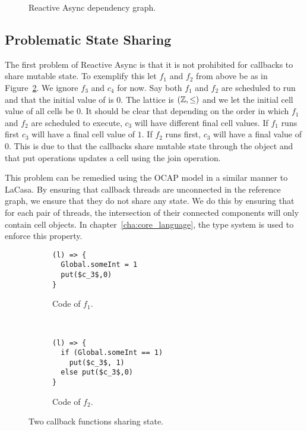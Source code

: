 \begin{figure}
  \centering
  \caption{Reactive Async dependency graph.}
  \label{fig:ra_example2}
\end{figure}

\subsection{Problematic State Sharing}%
\label{sub:sharing_state}

The first problem of Reactive Async is that it is not prohibited for callbacks
to share mutable state. To exemplify this let $f_1$ and $f_2$ from above be as
in Figure~\ref{fig:ra_fun_shared_state}. We ignore $f_3$ and $c_4$ for now. 
Say both $f_1$ and $f_2$ are scheduled to run and that the initial value of
 is $0$.  The lattice is $(\mathbb{Z}, \leq)$ and we let the
initial cell value of all cells be $0$.  It should be clear that depending on
the order in which $f_1$ and $f_2$ are scheduled to execute, $c_3$ will have 
different final cell values. If $f_1$ runs first $c_3$ will have a final cell
value of $1$. If $f_2$ runs first, $c_3$ will have a final value of $0$. This is
due to that the callbacks share mutable state through the  object
and that put operations updates a cell using the join operation.

This problem can be remedied using the OCAP model in a similar manner to LaCasa.
By ensuring that callback threads are unconnected in the reference graph, we ensure
that they do not share any state. We do this by ensuring that for each pair of
threads, the intersection of their connected components will only contain cell
objects. In chapter~\ref{cha:core_language}, the type system is used to enforce
this property.

\begin{figure}
  \begin{subfigure}[b]{0.5\textwidth}
    \begin{lstlisting}
(l) => {
  Global.someInt = 1
  put($c_3$,0)
}
    \end{lstlisting}
    \caption{Code of $f_1$.}
  \end{subfigure}
  ~
  \begin{subfigure}[b]{0.5\textwidth}
    \begin{lstlisting}
(l) => {
  if (Global.someInt == 1)
    put($c_3$, 1)
  else put($c_3$,0)
}
    \end{lstlisting}
    \caption{Code of $f_2$.}
  \end{subfigure}
  \caption{Two callback functions sharing state.}
  \label{fig:ra_fun_shared_state}
\end{figure}


